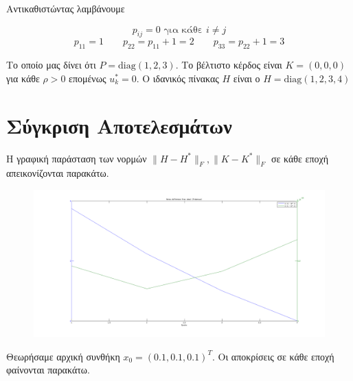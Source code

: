 \documentclass[a4paper,oneside,12pt]{article}
\begin{document}
Αντικαθιστώντας λαμβάνουμε 

$$p_{ij} = 0  \text{ για κάθε } i \neq j$$
$$p_{11} = 1 \qquad p_{22} = p_{11} + 1 = 2 \qquad p_{33} = p_{22} + 1 = 3$$

Το οποίο μας δίνει ότι $P = \mathrm{diag} (1,2,3)$. Το βέλτιστο κέρδος είναι $K = (0, 0, 0)$ για κάθε $\rho > 0$ επομένως $u^*_k = 0$. Ο ιδανικός πίνακας $H$ είναι ο $H = \mathrm {diag} (1,2,3,4)$


\section{Σύγκριση Αποτελεσμάτων}

Η γραφική παράσταση των νορμών $\| H - H^* \|_F, \| K - K^* \|_F$ σε κάθε εποχή απεικονίζονται παρακάτω.


\begin{figure}[H]
\centering
\includegraphics[scale=0.35]{norms.png}
\label{}
\end{figure}


Θεωρήσαμε αρχική συνθήκη $x_0 = (0.1, 0.1, 0.1)^T$. Οι αποκρίσεις σε κάθε εποχή φαίνονται παρακάτω.
\end{document}

